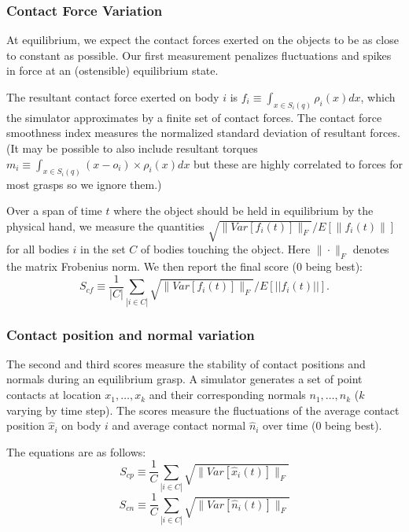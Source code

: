 \subsubsection{Contact Force Variation}

At equilibrium, we expect the contact forces exerted on the objects to be as close to constant as possible. Our first measurement penalizes fluctuations and spikes in force at an (ostensible) equilibrium state. 

The resultant contact force exerted on body $i$  is $f_i \equiv \int_{x\in S_i(q)} \rho_i(x) dx$, which the simulator approximates by a finite set of contact forces.  The contact force smoothness index measures the normalized standard deviation of resultant forces. (It may be possible to also include resultant torques  $m_i \equiv \int_{x\in S_i(q)} (x-o_i) \times \rho_i(x) dx$ but these are highly correlated to forces for most grasps so we ignore them.) 

Over a span of time $t$ where the object should be held in equilibrium by the physical hand, we measure the quantities $\sqrt{\|Var[f_i(t)]\|_F} / E[\|f_i(t)\|]$ for all bodies $i$ in the set $C$ of bodies touching the object.  Here $\|\cdot\|_F$ denotes the matrix Frobenius norm. We then report the final score (0 being best):
\begin{equation}
S_{cf} \equiv \frac{1}{|C|} \sum_{|i\in C|} \sqrt{\|Var[f_i(t)]\|_F} / E[||f_i(t)||].
\end{equation}

\subsubsection{Contact position and normal variation}
The second and third scores measure the stability of contact positions and normals during an equilibrium grasp.  A simulator generates a set of point contacts at location $x_1,\ldots,x_k$ and their corresponding normals $n_1,\ldots,n_k$ ($k$ varying by time step).  The scores measure the fluctuations of the average contact position $\hat{x}_i$ on body $i$ and average contact normal $\hat{n}_i$ over time (0 being best).

The equations are as follows:
\begin{equation}
S_{cp} \equiv \frac{1}{C} \sum_{|i\in C|} \sqrt{\|Var[\hat{x}_i(t)]\|_F}
\end{equation}
\begin{equation}
S_{cn} \equiv \frac{1}{C} \sum_{|i\in C|} \sqrt{\|Var[\hat{n}_i(t)]\|_F}
\end{equation}

